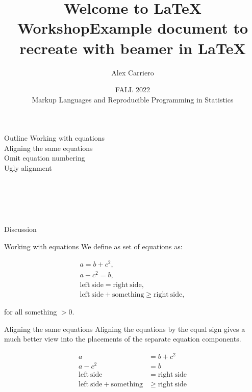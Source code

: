 \documentclass[
  9pt,
  ignorenonframetext,
]{beamer}
\title{Welcome to \LaTeX{} Workshop}
\title{Example document to recreate with beamer in \LaTeX}
\author{Alex Carriero \vspace{0.5in}}
\date{FALL 2022\\
Markup Languages and Reproducible Programming in Statistics}
\begin{document}
\frame{\titlepage}

\begin{frame}{Outline}
\protect\hypertarget{outline}{}
Working with equations\\
\hspace*{0.333em}\hspace*{0.333em}\hspace*{0.333em}\hspace*{0.333em}Aligning
the same equations\\
\hspace*{0.333em}\hspace*{0.333em}\hspace*{0.333em}\hspace*{0.333em}Omit
equation numbering\\
\hspace*{0.333em}\hspace*{0.333em}\hspace*{0.333em}\hspace*{0.333em}Ugly
alignment\\
\strut \\
\strut \\
\strut \\

Discussion
\end{frame}

\begin{frame}{Working with equations}
\protect\hypertarget{working-with-equations}{}
We define as set of equations as:

\begin{gather}
a = b + c^2,\\
a- c^2 = b, \\
\mathrm{left \ side} = \mathrm{right \ side}, \\
\mathrm{left \ side} + \mathrm{something} \geq \mathrm{right \ side},
\end{gather}

for all something \(> 0\).
\end{frame}

\begin{frame}{Aligning the same equations}
\protect\hypertarget{aligning-the-same-equations}{}
Aligning the equations by the equal sign gives a much better view into
the placements of the separate equation components.

\begin{align}
a &= b + c^2\\
a- c^2 &= b \\
\mathrm{left \ side} &= \mathrm{right \ side} \\
\mathrm{left \ side} + \mathrm{something} &\geq \mathrm{right \ side}
\end{align}
\end{frame}
\end{document}
